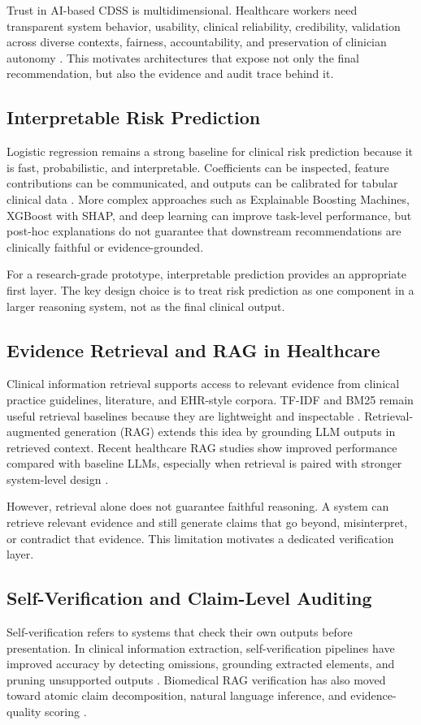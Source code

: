 \documentclass[conference]{IEEEtran}
\begin{document}
Trust in AI-based CDSS is multidimensional. Healthcare workers need transparent system behavior, usability, clinical reliability, credibility, validation across diverse contexts, fairness, accountability, and preservation of clinician autonomy \cite{trust2025}. This motivates architectures that expose not only the final recommendation, but also the evidence and audit trace behind it.

\subsection{Interpretable Risk Prediction}
Logistic regression remains a strong baseline for clinical risk prediction because it is fast, probabilistic, and interpretable. Coefficients can be inspected, feature contributions can be communicated, and outputs can be calibrated for tabular clinical data \cite{hosmer2013}. More complex approaches such as Explainable Boosting Machines, XGBoost with SHAP, and deep learning can improve task-level performance, but post-hoc explanations do not guarantee that downstream recommendations are clinically faithful or evidence-grounded.

For a research-grade prototype, interpretable prediction provides an appropriate first layer. The key design choice is to treat risk prediction as one component in a larger reasoning system, not as the final clinical output.

\subsection{Evidence Retrieval and RAG in Healthcare}
Clinical information retrieval supports access to relevant evidence from clinical practice guidelines, literature, and EHR-style corpora. TF-IDF and BM25 remain useful retrieval baselines because they are lightweight and inspectable \cite{sparckjones1972}. Retrieval-augmented generation (RAG) extends this idea by grounding LLM outputs in retrieved context. Recent healthcare RAG studies show improved performance compared with baseline LLMs, especially when retrieval is paired with stronger system-level design \cite{ragmeta2025,ragreview2025}.

However, retrieval alone does not guarantee faithful reasoning. A system can retrieve relevant evidence and still generate claims that go beyond, misinterpret, or contradict that evidence. This limitation motivates a dedicated verification layer.

\subsection{Self-Verification and Claim-Level Auditing}
Self-verification refers to systems that check their own outputs before presentation. In clinical information extraction, self-verification pipelines have improved accuracy by detecting omissions, grounding extracted elements, and pruning unsupported outputs \cite{selfverification2023}. Biomedical RAG verification has also moved toward atomic claim decomposition, natural language inference, and evidence-quality scoring \cite{medragchecker2026,verirag2025}.
\end{document}
